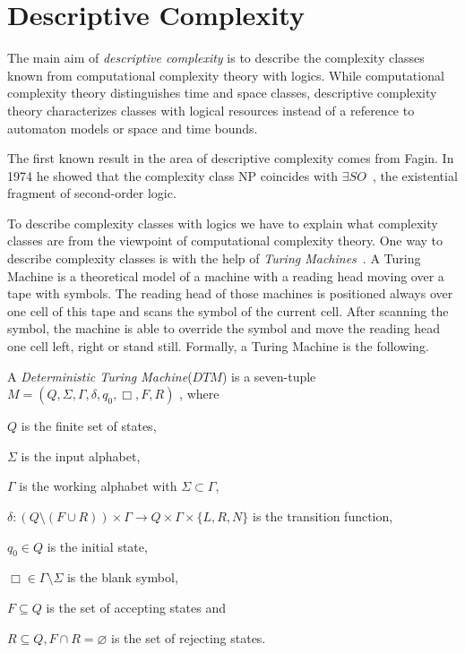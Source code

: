 

\section{Descriptive Complexity}\label{sec:descriptiveComplexity}

The main aim of \emph{descriptive complexity} is to describe the complexity classes known from
computational complexity theory with logics. While computational complexity theory distinguishes time and space
classes, descriptive complexity theory characterizes classes with logical resources instead of a reference to
automaton models or space and time bounds.

The first known result in the area of descriptive complexity comes from Fagin. In 1974 he showed that the complexity
class NP coincides with $\exists SO$~\cite{fagin1974generalized}, the existential fragment of second-order logic.

To describe complexity classes with logics we have to explain what complexity classes are from the viewpoint of
computational complexity theory. One way to describe complexity classes is with the help of \textit{Turing
Machines}~\cite{hopcroft1994einfuehrung}.
A Turing Machine is a theoretical model of a machine with a reading head moving over a tape with symbols. The reading head of
those machines is positioned always over one cell of this tape and scans the symbol of the current cell. After scanning
the symbol, the machine is able to override the symbol and move the reading head one cell left, right or stand still.
Formally, a Turing Machine is the following.

\begin{definition}
\label{definition:dtm}
    A \emph{Deterministic Turing Machine}($\mathit{DTM}$) is a seven-tuple $M = (Q, \Sigma, \Gamma, \delta, q_0, \Box, F, R)$
    , where
    \begin{compactitem}
        \item $Q$ is the finite set of states,
        \item $\Sigma$ is the input alphabet,
        \item $\Gamma$ is the working alphabet with $\Sigma \subset \Gamma$,
        \item $\delta : (Q \setminus (F \cup R)) \times \Gamma \rightarrow Q \times \Gamma \times \{L, R, N\}$ is the
        transition function,
        \item $q_0 \in Q$ is the initial state,
        \item $\Box \in \Gamma \setminus \Sigma$ is the blank symbol,
        \item $F \subseteq Q$ is the set of accepting states and
        \item $R \subseteq Q, F \cap R = \varnothing$ is the set of rejecting states.
    \end{compactitem}
\end{definition}

